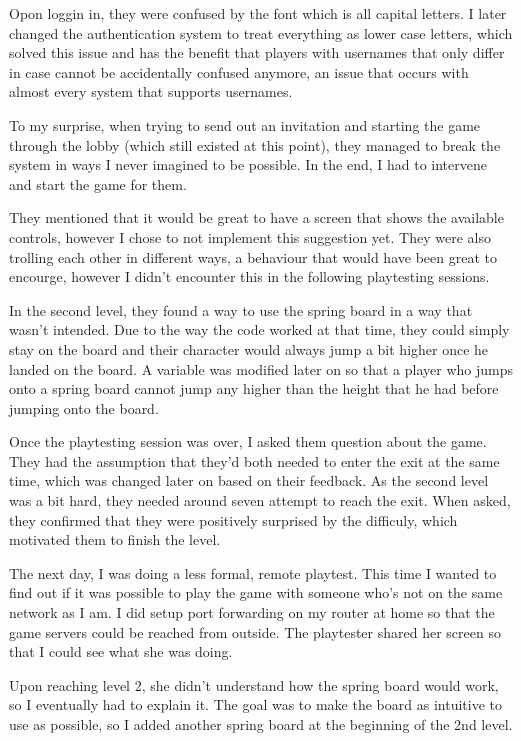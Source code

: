 \documentclass{article}
\begin{document}
Opon loggin in, they were confused by the font which is all capital letters. I later changed the authentication system to treat everything as lower case letters, which solved this issue and has the benefit that players with usernames that only differ in case cannot be accidentally confused anymore, an issue that occurs with almost every system that supports usernames.

To my surprise, when trying to send out an invitation and starting the game through the lobby (which still existed at this point), they managed to break the system in ways I never imagined to be possible. In the end, I had to intervene and start the game for them.

They mentioned that it would be great to have a screen that shows the available controls, however I chose to not implement this suggestion yet.
They were also trolling each other in different ways, a behaviour that would have been great to encourge, however I didn't encounter this in the following playtesting sessions.

In the second level, they found a way to use the spring board in a way that wasn't intended. Due to the way the code worked at that time, they could simply stay on the board and their character would always jump a bit higher once he landed on the board. A variable was modified later on so that a player who jumps onto a spring board cannot jump any higher than the height that he had before jumping onto the board.

Once the playtesting session was over, I asked them question about the game. They had the assumption that they'd both needed to enter the exit at the same time, which was changed later on based on their feedback. As the second level was a bit hard, they needed around seven attempt to reach the exit. When asked, they confirmed that they were positively surprised by the difficuly, which motivated them to finish the level.

\bigskip
The next day, I was doing a less formal, remote playtest. This time I wanted to find out if it was possible to play the game with someone who's not on the same network as I am. I did setup port forwarding on my router at home so that the game servers could be reached from outside. The playtester shared her screen so that I could see what she was doing. 

Upon reaching level 2, she didn't understand how the spring board would work, so I eventually had to explain it. The goal was to make the board as intuitive to use as possible, so I added another spring board at the beginning of the 2nd level. 
\end{document}
